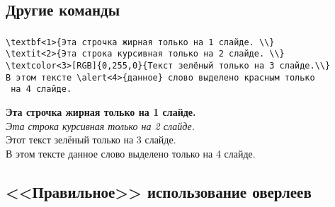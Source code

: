 \documentclass[aspectratio=169,
]{beamer}
\begin{document}
\subsection{Другие команды}
\begin{frame}[fragile, label=f12]
\frametitle{\insertsection}
\framesubtitle{\insertsubsection}
\begin{verbatim}
\textbf<1>{Эта строчка жирная только на 1 слайде. \\}
\textit<2>{Эта строка курсивная только на 2 слайде. \\}
\textcolor<3>[RGB]{0,255,0}{Текст зелёный только на 3 слайде.\\}
В этом тексте \alert<4>{данное} слово выделено красным только
 на 4 слайде.
\end{verbatim} \pause
\textbf<2>{Эта строчка жирная только на 1 слайде. } \\
\textit<3>{Эта строка курсивная только на 2 слайде. } \\
\textcolor<4>[RGB]{0,255,0}{Этот текст зелёный только на 3 слайде. } \\
В этом тексте \alert<5>{данное} слово выделено только на 4 слайде.
\end{frame}



\subsection{<<Правильное>> использование оверлеев}
\end{document}

